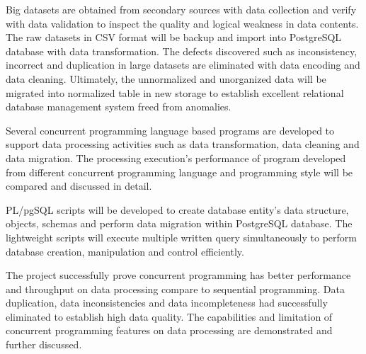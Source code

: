 \documentclass[12pt, oneside]{Thesis}
\begin{document}
Big datasets are obtained from secondary sources with data collection and verify with data validation to inspect the quality and logical weakness in data contents. The raw datasets in CSV format will be backup and import into PostgreSQL database with data transformation. The defects discovered such as inconsistency, incorrect and duplication in large datasets are eliminated with data encoding and data cleaning. Ultimately, the unnormalized and unorganized data will be migrated into normalized table in new storage to establish excellent relational database management system freed from anomalies. 

Several concurrent programming language based programs are developed to support data processing activities such as data transformation, data cleaning and data migration. The processing execution's performance of program developed from different concurrent programming language and programming style will be compared and discussed in detail. 

PL/pgSQL scripts will be developed to create database entity's data structure, objects, schemas and perform data migration within PostgreSQL database. The lightweight scripts will execute multiple written query simultaneously to perform database creation, manipulation and control efficiently.

The project successfully prove concurrent programming has better performance and throughput on data processing compare to sequential programming. Data duplication, data inconsistencies and data incompleteness had successfully eliminated to establish high data quality. The capabilities and limitation of concurrent programming features on data processing are demonstrated and further discussed.


\clearpage %
\pagebreak

\mainmatter 

\pagestyle{fancy} 

\raggedright


\end{document}
